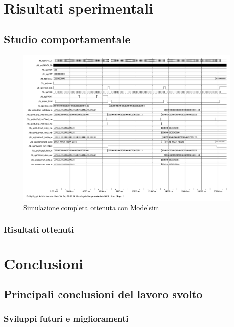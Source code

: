 \documentclass[titlepage]{report}
\begin{document}
\chapter*{Risultati sperimentali}
\label{ch:risultati_sperimentali}

	\section{Studio comportamentale}
	\label{sec:studio_comportamentale}

		\begin{figure}[ht]
			\centering
			\includegraphics[scale=0.5]{./img/simulation.pdf}
			\caption{Simulazione completa ottenuta con Modelsim}
			\label{fig:modelsim_sim_completa}
		\end{figure}

		\subsection{Risultati ottenuti}
		\label{subsec:risultati}

\chapter*{Conclusioni}
\label{ch:conclusioni}
	
	\section{Principali conclusioni del lavoro svolto}
	\label{sec:conclusioni}
		\subsection{Sviluppi futuri e miglioramenti}
		\label{subsec:sviluppi_futuri}
\end{document}
